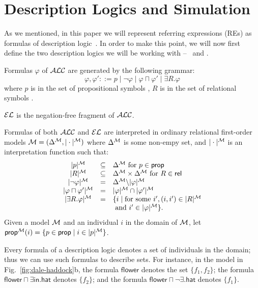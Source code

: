 \section{Description Logics and Simulation} \label{sec:bisim}

As we mentioned, in this paper we will represent referring expressions
(REs) as formulas of description logic~\cite{baad:desc03}.  In order
to make this point, we will now first define the two description
logics we will be working with -- \alc\ and \el.


\begin{definition}
Formulas $\varphi$ of $\mathcal{ALC}$ are generated by the following grammar:
$$
\varphi,\varphi' ::= p \mid \neg \varphi \mid \varphi \sqcap \varphi'
\mid \exists R. \varphi
$$
where $p$ is in the set of propositional symbols \prop, $R$ is in the
set of relational symbols \rel.

$\mathcal{EL}$ is the negation-free fragment of $\mathcal{ALC}$.

Formulas of both $\mathcal{ALC}$ and $\mathcal{EL}$ are interpreted in ordinary
relational first-order models $\mathcal{M} = (\Delta^{\mathcal{M}},|\cdot|^{\mathcal{M}})$ where
$\Delta^{\mathcal{M}}$ is some non-empy set, and $|\cdot|^{\mathcal{M}}$ is an
interpretation function such that:
$$
\begin{array}{ccl}
|p|^{\mathcal{M}} & \subseteq & \Delta^{\mathcal{M}}  \mbox{ for $p \in \textsf{prop}$}\\
|R|^{\mathcal{M}} & \subseteq & \Delta^{\mathcal{M}} \times \Delta^{\mathcal{M}}  \mbox{ for $R \in \textsf{rel}$}\\
|\neg \varphi|^{\mathcal{M}} & = & \Delta^{\mathcal{M}} \backslash |\varphi|^{\mathcal{M}}\\
|\varphi \sqcap \varphi'|^{\mathcal{M}} & = & |\varphi|^{\mathcal{M}} \cap |\varphi'|^{\mathcal{M}}\\
|\exists R.\varphi|^{\mathcal{M}} & = & \{i \mid \mbox{for some } i', (i,i') \in |R|^{\mathcal{M}}\\
& & \mbox{ and } i' \in |\varphi|^{\mathcal{M}} \}.\\
\end{array}
$$
Given a model $\mathcal{M}$ and an individual $i$ in the domain of $\mathcal{M}$, let
$\textsf{prop}^{\mathcal{M}}(i) = \{p \in \textsf{prop} \mid i \in |p|^{\mathcal{M}}\}$.
\end{definition}

Every formula of a description logic denotes a set of individuals in
the domain; thus we can use such formulas to describe sets.  For
instance, in the model in Fig.~\ref{fig:dale-haddock}b, the formula
$\mathsf{flower}$ denotes the set $\{f_1,f_2\}$; the formula
$\mathsf{flower} \sqcap \exists \mathsf{in}.\mathsf{hat}$ denotes
$\{f_2\}$; and the formula $\mathsf{flower} \sqcap \neg
\exists.\mathsf{hat}$ denotes $\{f_1\}$.


